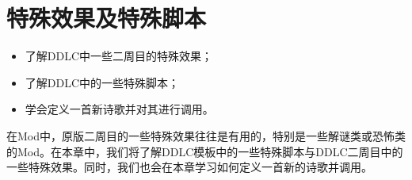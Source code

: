 \documentclass[../../Main.tex]{subfiles}
\begin{document}
\chapter{特殊效果及特殊脚本}

\begin{ChapterGoals}
    \begin{itemize}
        \item 了解DDLC中一些二周目的特殊效果；
        \item 了解DDLC中的一些特殊脚本；
        \item 学会定义一首新诗歌并对其进行调用。
    \end{itemize}
\end{ChapterGoals}

在Mod中，原版二周目的一些特殊效果往往是有用的，特别是一些解谜类或恐怖类的Mod。在本章中，我们将了解DDLC模板中的一些特殊脚本与DDLC二周目中的一些特殊效果。同时，我们也会在本章学习如何定义一首新的诗歌并调用。



\end{document}
